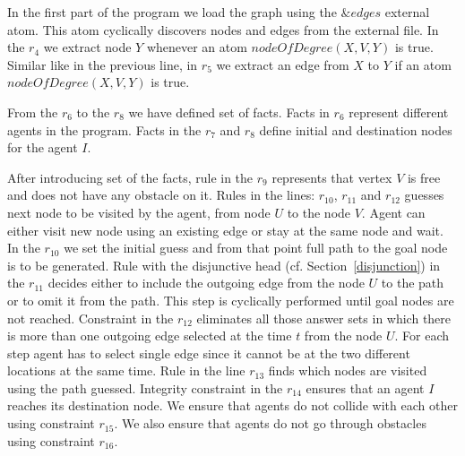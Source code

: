 \documentclass[14pt,a4paper, titlepage]{article}
\begin{document}
In the first part of the program we load the graph using 
the $\&edges$ external atom. This atom cyclically discovers 
nodes and edges from the external file. In the $r_4$ we 
extract node $Y$ whenever an atom $\mathit{nodeOfDegree(X, 
V, Y)}$ is true. Similar like in the previous line, in 
$r_5$ we extract an edge from $X$ to $Y$ if an atom 
$\mathit{nodeOfDegree(X, V,Y)}$ is true. 

From the $r_6$ to the $r_8$ we have defined set of facts. 
Facts in $r_6$ represent different agents in the program. 
Facts in the $r_{7}$ and $r_{8}$ define initial and 
destination nodes for the agent $I$.  

After introducing set of the facts, rule in the $r_{9}$ 
represents that vertex $V$ is free and does not have any 
obstacle on it. Rules in the lines: $r_{10}$, $r_{11}$ and 
$r_{12}$ guesses next node to be visited by the agent, from 
node $U$ to the node $V$. Agent can either visit new node 
using an existing edge or stay at the same node and wait. 
In the $r_{10}$ we set the initial guess and from that 
point full path to the goal node is to be generated. Rule 
with the disjunctive head (cf. Section~\ref{disjunction}) 
in the $r_{11}$ decides either to include the outgoing edge 
from the node $U$ to the path or to omit it from the path. 
This step is cyclically performed until goal nodes are not 
reached. Constraint in the $r_{12}$ eliminates all those 
answer sets in which there is more than one outgoing edge 
selected at the time $t$ from the node $U$. For each step 
agent has to select single edge since it cannot be at the 
two different locations at the same time. Rule in the line 
$r_{13}$ finds which nodes are visited using the path 
guessed. Integrity constraint in the $r_{14}$ ensures that 
an agent $I$ reaches its destination node. We ensure that 
agents do not collide with each other using constraint 
$r_{15}$. We also ensure that agents do not go through 
obstacles using constraint $r_{16}$. 
\end{document}
